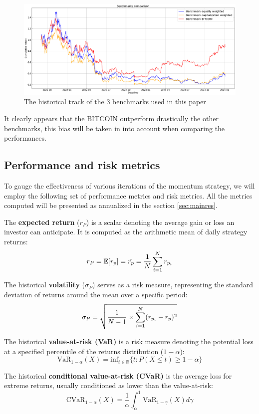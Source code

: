 \documentclass{article}
\begin{document}
\begin{figure}[H] %
    \centering
    \includegraphics[width=1\linewidth]{benchmarks_only.png}
    \caption{The historical track of the 3 benchmarks used in this paper}
  \label{fig:fig1}
\end{figure}
It clearly appears that the BITCOIN outperform drastically the other benchmarks, this bias will be taken in into account when comparing the performances.
\subsection{Performance and risk metrics}\label{subsec:perfandrisk}
To gauge the effectiveness of various iterations of the momentum strategy, we will employ the following set of performance metrics and risk metrics. All the metrics computed will be presented as annualized in the section \ref{sec:mainres}.


The \textbf{expected return} (\(r_P\)) is a scalar denoting the average gain or loss an investor can anticipate. It is computed as the arithmetic mean of daily strategy returns:
    \[r_P=\mathbb{E}[r_p]=\Bar{r_p}=\frac{1}{N}\sum_{i=1}^Nr_{p_i}\]
    
The historical \textbf{volatility} (\(\sigma_P\)) serves as a risk measure, representing the standard deviation of returns around the mean over a specific period:
    \[\sigma_P = \sqrt{\frac{1}{N-1}\times\sum^N_{i=1}(r_{p_i}-\Bar{r_p})^2}\]

The historical \textbf{value-at-risk (VaR)} is a risk measure denoting the potential loss at a specified percentile of the returns distribution (\(1-\alpha\)):
    \[\text{VaR}_{1-\alpha}(X)=\text{inf}_{t\in\mathbb{R}}\{t:P(X\leq t)\geq1-\alpha\}\]

The historical \textbf{conditional value-at-risk (CVaR)} is the average loss for extreme returns, usually conditioned as lower than the value-at-risk:
    \[\text{CVaR}_{1-\alpha}(X)=\frac{1}{\alpha}\int_\alpha^1\text{VaR}_{1-\gamma}(X)d\gamma\]
\end{document}
